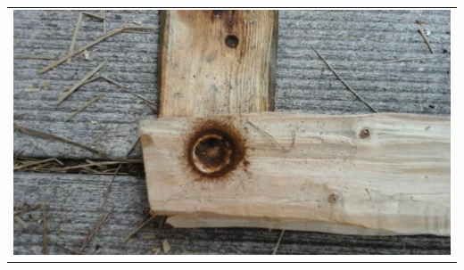 \documentclass[a4paper, handout]{beamer}
\begin{document}
\begin{frame}
\begin{tabular}{ c c }
		\\
		\multicolumn{2}{c}{ \includegraphics[scale=0.16]{indraaien-5}}
	\end{tabular}
\end{frame}
\end{document}

